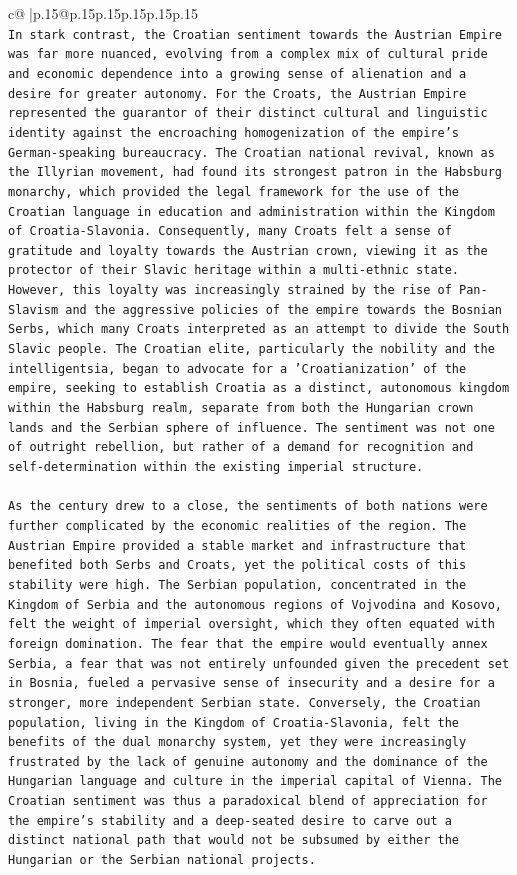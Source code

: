 \documentclass{article}
\begin{document}
{\begin{supertabular}{c@{$\;$}|p{.15\linewidth}@{}p{.15\linewidth}p{.15\linewidth}p{.15\linewidth}p{.15\linewidth}p{.15\linewidth}}
{{{\\ 
\texttt{In stark contrast, the Croatian sentiment towards the Austrian Empire was far more nuanced, evolving from a complex mix of cultural pride and economic dependence into a growing sense of alienation and a desire for greater autonomy. For the Croats, the Austrian Empire represented the guarantor of their distinct cultural and linguistic identity against the encroaching homogenization of the empire's German{-}speaking bureaucracy. The Croatian national revival, known as the Illyrian movement, had found its strongest patron in the Habsburg monarchy, which provided the legal framework for the use of the Croatian language in education and administration within the Kingdom of Croatia{-}Slavonia. Consequently, many Croats felt a sense of gratitude and loyalty towards the Austrian crown, viewing it as the protector of their Slavic heritage within a multi{-}ethnic state. However, this loyalty was increasingly strained by the rise of Pan{-}Slavism and the aggressive policies of the empire towards the Bosnian Serbs, which many Croats interpreted as an attempt to divide the South Slavic people. The Croatian elite, particularly the nobility and the intelligentsia, began to advocate for a 'Croatianization' of the empire, seeking to establish Croatia as a distinct, autonomous kingdom within the Habsburg realm, separate from both the Hungarian crown lands and the Serbian sphere of influence. The sentiment was not one of outright rebellion, but rather of a demand for recognition and self{-}determination within the existing imperial structure.} \\
\\ 
\texttt{As the century drew to a close, the sentiments of both nations were further complicated by the economic realities of the region. The Austrian Empire provided a stable market and infrastructure that benefited both Serbs and Croats, yet the political costs of this stability were high. The Serbian population, concentrated in the Kingdom of Serbia and the autonomous regions of Vojvodina and Kosovo, felt the weight of imperial oversight, which they often equated with foreign domination. The fear that the empire would eventually annex Serbia, a fear that was not entirely unfounded given the precedent set in Bosnia, fueled a pervasive sense of insecurity and a desire for a stronger, more independent Serbian state. Conversely, the Croatian population, living in the Kingdom of Croatia{-}Slavonia, felt the benefits of the dual monarchy system, yet they were increasingly frustrated by the lack of genuine autonomy and the dominance of the Hungarian language and culture in the imperial capital of Vienna. The Croatian sentiment was thus a paradoxical blend of appreciation for the empire's stability and a deep{-}seated desire to carve out a distinct national path that would not be subsumed by either the Hungarian or the Serbian national projects.} \\
}}}
\end{supertabular}}
\end{document}
